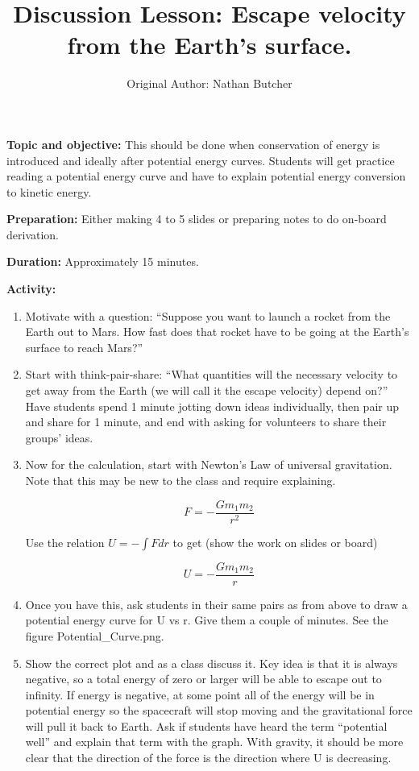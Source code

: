 \documentclass{article}
\title{Discussion Lesson: Escape velocity from the Earth's surface.}
\author{Original Author: Nathan Butcher}
\date{}
\begin{document}
\maketitle

\textbf{Topic and objective:} This should be done when conservation of energy is introduced and ideally after potential energy curves. Students will get practice reading a potential energy curve and have to explain potential energy conversion to kinetic energy.

\textbf{Preparation:} Either making 4 to 5 slides or preparing notes to do on-board derivation. 

\textbf{Duration:} Approximately 15 minutes. 

\hspace{14pt}

\textbf{Activity:}
\begin{enumerate}
\item Motivate with a question: ``Suppose you want to launch a rocket from the Earth out to Mars. How fast does that rocket have to be going at the Earth's surface to reach Mars?''

\item Start with think-pair-share: ``What quantities will the necessary velocity to get away from the Earth (we will call it the escape velocity) depend on?'' Have students spend 1 minute jotting down ideas individually, then pair up and share for 1 minute, and end with asking for volunteers to share their groups' ideas.

\item Now for the calculation, start with Newton's Law of universal gravitation. Note that this may be new to the class and require explaining.

\begin{equation}
F = - \frac{G m_1 m_2}{r^2}
\end{equation}

Use the relation $U = - \int F dr$ to get (show the work on slides or board) 

\begin{equation}
U = - \frac{G m_1 m_2}{r}
\end{equation}

\item Once you have this, ask students in their same pairs as from above to draw a potential energy curve for U vs r. Give them a couple of minutes. See the figure Potential\_Curve.png.

\item Show the correct plot and as a class discuss it. Key idea is that it is always negative, so a total energy of zero or larger will be able to escape out to infinity. If energy is negative, at some point all of the energy will be in potential energy so the spacecraft will stop moving and the gravitational force will pull it back to Earth. Ask if students have heard the term ``potential well'' and explain that term with the graph. With gravity, it should be more clear that the direction of the force is the direction where U is decreasing.


\end{enumerate}
\end{document}
